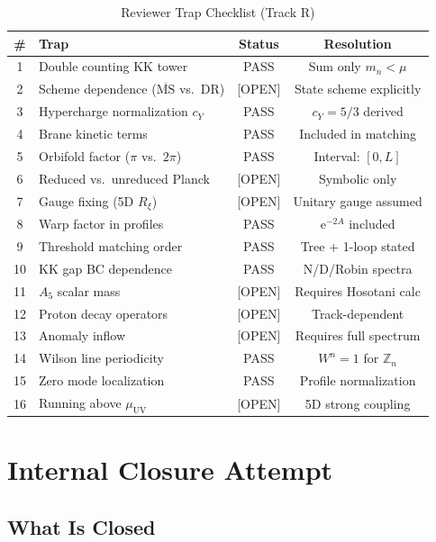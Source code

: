 \documentclass[11pt,a4paper]{article}
\newcommand{\ee}{\mathrm{e}}
\begin{document}
\begin{table}[h]
\centering
\caption{Reviewer Trap Checklist (Track R)}
\label{tab:traps}
\begin{tabular}{clcc}
\toprule
\# & Trap & Status & Resolution \\
\midrule
1 & Double counting KK tower & PASS & Sum only $m_n < \mu$ \\
2 & Scheme dependence ($\overline{\text{MS}}$ vs.\ DR) & [OPEN] & State scheme explicitly \\
3 & Hypercharge normalization $c_Y$ & PASS & $c_Y = 5/3$ derived \\
4 & Brane kinetic terms & PASS & Included in matching \\
5 & Orbifold factor ($\pi$ vs.\ $2\pi$) & PASS & Interval: $[0,L]$ \\
6 & Reduced vs.\ unreduced Planck & [OPEN] & Symbolic only \\
7 & Gauge fixing (5D $R_\xi$) & [OPEN] & Unitary gauge assumed \\
8 & Warp factor in profiles & PASS & $\ee^{-2A}$ included \\
9 & Threshold matching order & PASS & Tree + 1-loop stated \\
10 & KK gap BC dependence & PASS & N/D/Robin spectra \\
11 & $A_5$ scalar mass & [OPEN] & Requires Hosotani calc \\
12 & Proton decay operators & [OPEN] & Track-dependent \\
13 & Anomaly inflow & [OPEN] & Requires full spectrum \\
14 & Wilson line periodicity & PASS & $W^n = 1$ for $\mathbb{Z}_n$ \\
15 & Zero mode localization & PASS & Profile normalization \\
16 & Running above $\mu_{\text{UV}}$ & [OPEN] & 5D strong coupling \\
\bottomrule
\end{tabular}
\end{table}

\section{Internal Closure Attempt}
\label{sec:closure}

\subsection{What Is Closed}
\end{document}
